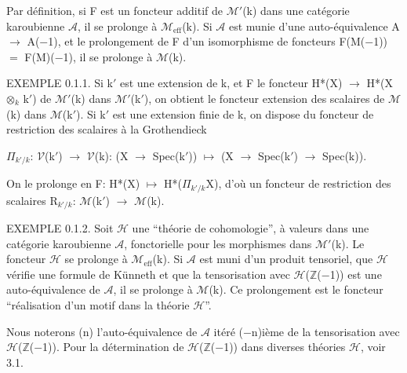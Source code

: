 \documentclass[10pt,twoside]{article}
\begin{document}
Par définition, si F est un foncteur additif de \ensuremath{ℳ}\ensuremath{′}(k) dans une catégorie karoubienne \ensuremath{𝒜}, il se prolonge à \ensuremath{ℳ}\ensuremath{_{\mathrm{eff}}}(k). Si \ensuremath{𝒜} est munie d’une auto-équivalence A \ensuremath{→} A(\ensuremath{−}1), et le prolongement de F d’un isomorphisme de foncteurs F(M(\ensuremath{−}1)) \ensuremath{=} F(M)(\ensuremath{−}1), il se prolonge à \ensuremath{ℳ}(k).\par
EXEMPLE 0.1.1. Si k\ensuremath{′} est une extension de k, et F le foncteur H*(X) \ensuremath{→} H*(X \ensuremath{⊗}\ensuremath{_{k}} k\ensuremath{′}) de \ensuremath{ℳ}\ensuremath{′}(k) dans \ensuremath{ℳ}\ensuremath{′}(k\ensuremath{′}), on obtient le foncteur extension des scalaires de \ensuremath{ℳ}(k) dans \ensuremath{ℳ}(k\ensuremath{′}). Si k\ensuremath{′} est une extension finie de k, on dispose du foncteur de restriction des scalaires à la Grothendieck\par
\ensuremath{Π}\ensuremath{_{k′/k}}: \ensuremath{𝒱}(k\ensuremath{′}) \ensuremath{→} \ensuremath{𝒱}(k): (X \ensuremath{→} Spec(k\ensuremath{′})) \ensuremath{↦} (X \ensuremath{→} Spec(k\ensuremath{′}) \ensuremath{→} Spec(k)).\par
On le prolonge en F: H*(X) \ensuremath{↦} H*(\ensuremath{Π}\ensuremath{_{k′/k}}X), d’où un foncteur de restriction des scalaires R\ensuremath{_{k′/k}}: \ensuremath{ℳ}(k\ensuremath{′}) \ensuremath{→} \ensuremath{ℳ}(k).\par
EXEMPLE 0.1.2. Soit \ensuremath{ℋ} une “théorie de cohomologie”, à valeurs dans une catégorie karoubienne \ensuremath{𝒜}, fonctorielle pour les morphismes dans \ensuremath{ℳ}\ensuremath{′}(k). Le foncteur \ensuremath{ℋ} se prolonge à \ensuremath{ℳ}\ensuremath{_{\mathrm{eff}}}(k). Si \ensuremath{𝒜} est muni d’un produit tensoriel, que \ensuremath{ℋ} vérifie une formule de Künneth et que la tensorisation avec \ensuremath{ℋ}(\ensuremath{ℤ}(\ensuremath{−}1)) est une auto-équivalence de \ensuremath{𝒜}, il se prolonge à \ensuremath{ℳ}(k). Ce prolongement est le foncteur “réalisation d’un motif dans la théorie \ensuremath{ℋ}”.\par
Nous noterons (n) l’auto-équivalence de \ensuremath{𝒜} itéré (\ensuremath{−}n)ième de la tensorisation avec \ensuremath{ℋ}(\ensuremath{ℤ}(\ensuremath{−}1)). Pour la détermination de \ensuremath{ℋ}(\ensuremath{ℤ}(\ensuremath{−}1)) dans diverses théories \ensuremath{ℋ}, voir 3.1.\par
\end{document}
